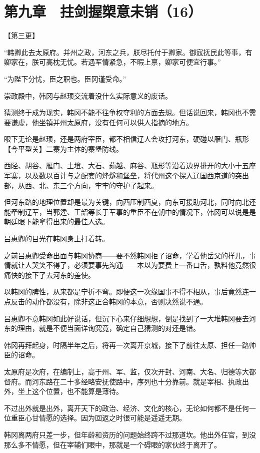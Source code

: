 \section{第九章　拄剑握槊意未销（16）}

【第三更】

“韩卿此去太原府。并州之政，河东之兵，朕尽托付于卿家。御寇抚民此等事，有卿家在，朕可高枕无忧。若遇军情紧急，不暇上禀，卿家可便宜行事。”

“为陛下分忧，臣之职也。臣冈谨受命。”

崇政殿中，韩冈与赵顼交流着没什么实际意义的废话。

猜测终于成为现实，韩冈不能不往争权夺利的方面去想。但话说回来，韩冈也不需要谦虚，他坐镇并州太原府，没有任何可以供人指摘的地方。

眼下无论是赵顼，还是两府宰臣，都不相信辽人会攻打河东，硬碰以雁门、瓶形【今平型关】二寨为主体的寨堡防线。

西陉、胡谷、雁门、土墱、大石、茹越、麻谷、瓶形等沿着边界排开的大小十五座军寨，以及数以百计与之配套的烽燧和堡垒，将代州这个探入辽国西京道的突出部，从西、北、东三个方向，牢牢的守护了起来。

但河东路的地理位置却是最为关键，向西压制西夏，向东可援助河北，同时向北还能牵制辽军，当郭逵、王韶等长于军事的重臣不在朝中的情况下，韩冈可以说是是朝廷眼下能拿得出来的最佳人选。

吕惠卿的目光在韩冈身上打着转。

之前吕惠卿受命出面与韩冈协商——要不然韩冈拒了诏命，学着他岳父的样儿，事情就让人哭笑不得了，必须要事先沟通——本以为要费上一番口舌，孰料他竟然很痛快的接下了去河东的差使。

以韩冈的脾性，从来都是宁折不弯。即便这一次缘国事不得不相从，事后竟然连一点反击的动作都没有，除非这正合韩冈的本意，否则决然说不通。

吕惠卿不意韩冈如此好说话，但沉下心来仔细想想，倒是找到了一大堆韩冈要去河东的理由，就是不便当面详询究竟，确定自己猜测的对还是错。

韩冈再拜起身，时隔半年之后，将再一次离开京城，接下了前往太原、担任一路帅臣的诏命。

太原府是次府，在编制上，高于州、军、监，仅次开封、河南、大名、归德等大都督府。而河东路在二十多经略安抚使路中，序列也十分靠前。就是宰相、执政出外，坐上这个位置，也不能算是薄待。

不过出外就是出外，离开天下的政治、经济、文化的核心，无论如何都不是任何一位重臣心甘情愿的选择。因为回返之时很可能是遥遥无期。

韩冈离两府只差一步，但年龄和资历的问题始终跨不过那道坎。他出外任官，到没那么多不情愿，但在宰辅们眼中，那就是一个碍眼的家伙终于离开了。

